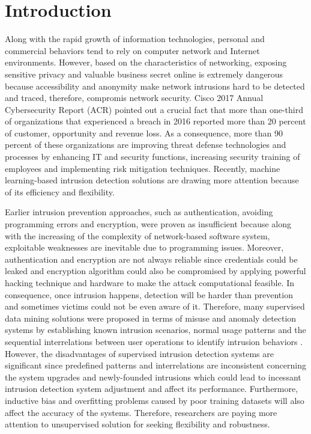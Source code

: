 \documentclass[conference]{IEEEtran}
\begin{document}
\section{Introduction}
Along with the rapid growth of information technologies, personal and commercial behaviors tend to rely on computer network and Internet environments. However, based on the characteristics of networking, exposing sensitive privacy and valuable business secret online is extremely dangerous because accessibility and anonymity make network intrusions hard to be detected and traced, therefore, compromis network security. Cisco 2017 Annual Cybersecurity Report (ACR) \cite{Cisco2017} pointed out a crucial fact that more than one-third of organizations that experienced a breach in 2016 reported more than 20 percent of customer, opportunity and revenue loss. As a consequence, more than 90 percent of these organizations are improving threat defense technologies and processes by enhancing IT and security functions, increasing security training of employees and implementing risk mitigation techniques. Recently, machine learning-based intrusion detection solutions are drawing more attention because of its efficiency and flexibility. 

Earlier intrusion prevention approaches, such as authentication, avoiding programming errors and encryption, were proven as insufficient because along with the increasing of the complexity of network-based software system, exploitable weaknesses are inevitable due to programming issues. Moreover, authentication and encryption are not always reliable since credentials could be leaked and encryption algorithm could also be compromised by applying powerful hacking technique and hardware to make the attack computational feasible. In consequence, once intrusion happens, detection will be harder than prevention and sometimes victims could not be even aware of it. Therefore, many supervised data mining solutions were proposed in terms of misuse and anomaly detection systems by establishing known intrusion scenarios, normal usage patterns and the sequential interrelations between user operations to identify intrusion behaviors \cite{Lee1998}. However, the disadvantages of supervised intrusion detection systems are significant since predefined patterns and interrelations are inconsistent concerning the system upgrades and newly-founded intrusions which could lead to incessant intrusion detection system adjustment and affect its performance. Furthermore, inductive bias and overfitting problems caused by poor training datasets will also affect the accuracy of the systems. Therefore, researchers are paying more attention to unsupervised solution for seeking flexibility and robustness.
\end{document}
